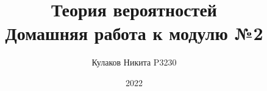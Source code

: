 
\title{Теория вероятностей\\ Домашняя работа к модулю №2}
\date{2022}
\author{Кулаков Никита P3230}



\maketitle

\begin{sloppypar}
\tableofcontents
\newpage


\end{sloppypar}


